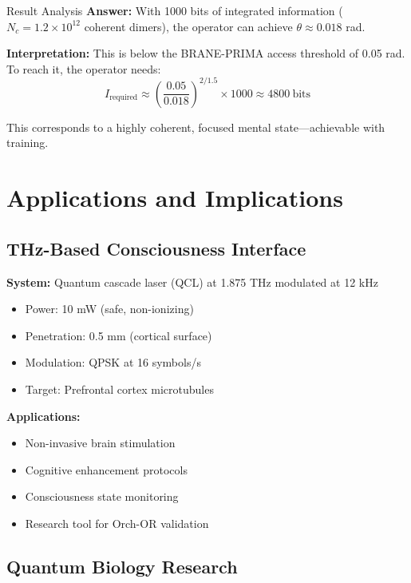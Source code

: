 \begin{calloutbox}[colback=black!8!white,colframe=black]{Result Analysis}
\textbf{Answer:} With 1000 bits of integrated information ($N_c = 1.2 \times 10^{12}$ coherent dimers), the operator can achieve $\theta \approx 0.018$ rad.

\textbf{Interpretation:} This is below the BRANE-PRIMA access threshold of 0.05 rad. To reach it, the operator needs:
\begin{equation}
I_{\text{required}} \approx \left(\frac{0.05}{0.018}\right)^{2/1.5} \times 1000 \approx 4800\ \text{bits}
\end{equation}

This corresponds to a highly coherent, focused mental state---achievable with training.
\end{calloutbox}

\section{Applications and Implications}

\subsection{THz-Based Consciousness Interface}

\textbf{System:} Quantum cascade laser (QCL) at 1.875 THz modulated at 12 kHz
\begin{itemize}
\item Power: 10 mW (safe, non-ionizing)
\item Penetration: 0.5 mm (cortical surface)
\item Modulation: QPSK at 16 symbols/s
\item Target: Prefrontal cortex microtubules
\end{itemize}

\textbf{Applications:}
\begin{itemize}
\item Non-invasive brain stimulation
\item Cognitive enhancement protocols
\item Consciousness state monitoring
\item Research tool for Orch-OR validation
\end{itemize}

\subsection{Quantum Biology Research}

